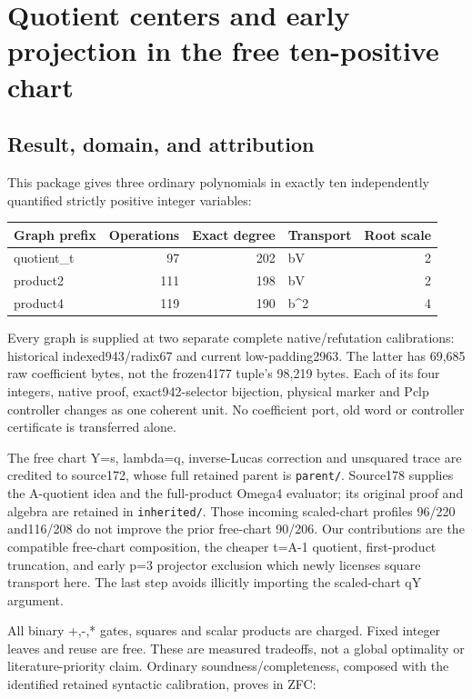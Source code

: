 \section{Quotient centers and early projection in the free ten-positive
chart}\label{quotient-centers-and-early-projection-in-the-free-ten-positive-chart}

\subsection{Result, domain, and
attribution}\label{result-domain-and-attribution}

This package gives three ordinary polynomials in exactly ten
independently quantified strictly positive integer variables:

\begin{longtable}[]{@{}lrrlr@{}}
\toprule\noalign{}
Graph prefix & Operations & Exact degree & Transport & Root scale \\
\midrule\noalign{}
\endhead
\bottomrule\noalign{}
\endlastfoot
quotient\_t & 97 & 202 & bV & 2 \\
product2 & 111 & 198 & bV & 2 \\
product4 & 119 & 190 & b\^{}2 & 4 \\
\end{longtable}

Every graph is supplied at two separate complete native/refutation
calibrations: historical indexed943/radix67 and current low-padding2963.
The latter has 69,685 raw coefficient bytes, not the frozen4177 tuple's
98,219 bytes. Each of its four integers, native proof, exact942-selector
bijection, physical marker and Pclp controller changes as one coherent
unit. No coefficient port, old word or controller certificate is
transferred alone.

The free chart Y=s, lambda=q, inverse-Lucas correction and unsquared
trace are credited to source172, whose full retained parent is
\texttt{parent/}. Source178 supplies the A-quotient idea and the
full-product Omega4 evaluator; its original proof and algebra are
retained in \texttt{inherited/}. Those incoming scaled-chart profiles
96/220 and116/208 do not improve the prior free-chart 90/206. Our
contributions are the compatible free-chart composition, the cheaper
t=A-1 quotient, first-product truncation, and early p=3 projector
exclusion which newly licenses square transport here. The last step
avoids illicitly importing the scaled-chart q\textbar Y argument.

All binary +,-,* gates, squares and scalar products are charged. Fixed
integer leaves and reuse are free. These are measured tradeoffs, not a
global optimality or literature-priority claim. Ordinary
soundness/completeness, composed with the identified retained syntactic
calibration, proves in ZFC:

